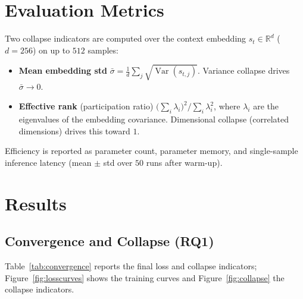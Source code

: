 \section{Evaluation Metrics}
Two collapse indicators are computed over the context embedding
$s_t \in \mathbb{R}^{d}$ ($d = 256$) on up to $512$ samples:
\begin{itemize}
    \item \textbf{Mean embedding std} $\bar\sigma = \frac{1}{d}\sum_j
    \sqrt{\operatorname{Var}(s_{t,j})}$. Variance collapse drives
    $\bar\sigma \rightarrow 0$.
    \item \textbf{Effective rank} (participation ratio)
    $\big(\sum_i \lambda_i\big)^2 / \sum_i \lambda_i^2$, where $\lambda_i$
    are the eigenvalues of the embedding covariance. Dimensional collapse
    (correlated dimensions) drives this toward $1$.
\end{itemize}
Efficiency is reported as parameter count, parameter memory, and
single-sample inference latency (mean $\pm$ std over $50$ runs after
warm-up).

\section{Results}

\subsection{Convergence and Collapse (RQ1)}
Table~\ref{tab:convergence} reports the final loss and collapse indicators;
Figure~\ref{fig:losscurves} shows the training curves and
Figure~\ref{fig:collapse} the collapse indicators.


